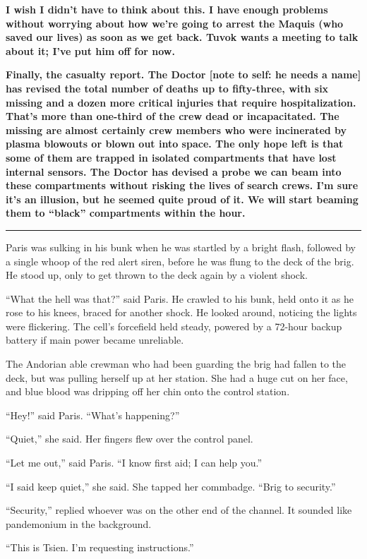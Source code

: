 \documentclass[twoside,letterpaper,12pt]{memoir}
\begin{document}
\textbf{I wish I didn't have to think about this. I have enough problems without worrying about how we're going to arrest the Maquis (who saved our lives) as soon as we get back. Tuvok wants a meeting to talk about it; I've put him off for now.}

\textbf{Finally, the casualty report. The Doctor [note to self: he needs a name] has revised the total number of deaths up to fifty-three, with six missing and a dozen more critical injuries that require hospitalization. That's more than one-third of the crew dead or incapacitated. The missing are almost certainly crew members who were incinerated by plasma blowouts or blown out into space. The only hope left is that some of them are trapped in isolated compartments that have lost internal sensors. The Doctor has devised a probe we can beam into these compartments without risking the lives of search crews. I'm sure it's an illusion, but he seemed quite proud of it. We will start beaming them to ``black'' compartments within the hour.}

\fancybreak{\rule{3cm}{0.4 pt}}
Paris was sulking in his bunk when he was startled by a bright flash, followed by a single whoop of the red alert siren, before he was flung to the deck of the brig. He stood up, only to get thrown to the deck again by a violent shock.

``What the hell was that?'' said Paris. He crawled to his bunk, held onto it as he rose to his knees, braced for another shock. He looked around, noticing the lights were flickering. The cell's forcefield held steady, powered by a 72-hour backup battery if main power became unreliable.

The Andorian able crewman who had been guarding the brig had fallen to the deck, but was pulling herself up at her station. She had a huge cut on her face, and blue blood was dripping off her chin onto the control station.

``Hey!'' said Paris. ``What's happening?''

``Quiet,'' she said. Her fingers flew over the control panel.

``Let me out,'' said Paris. ``I know first aid; I can help you.''

``I said keep quiet,'' she said. She tapped her commbadge. ``Brig to security.''

``Security,'' replied whoever was on the other end of the channel. It sounded like pandemonium in the background.

``This is Tsien. I'm requesting instructions.''
\end{document}
